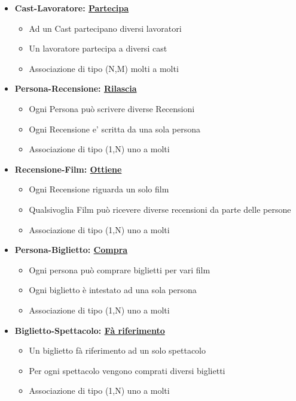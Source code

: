 \documentclass[10pt]{article}
\begin{document}
\begin{itemize}
		\item {\textbf{Cast-Lavoratore: \underline{Partecipa}}
		    \begin{itemize}
			    \item Ad un Cast partecipano diversi lavoratori
			    \item Un lavoratore partecipa a diversi cast
			    \item Associazione di tipo (N,M) molti a molti
		    \end{itemize}}
		\pagebreak
		\item {\textbf{Persona-Recensione: \underline{Rilascia}}
		    \begin{itemize}
			    \item Ogni Persona può scrivere diverse Recensioni 
			    \item Ogni Recensione e' scritta da una sola persona 
			    \item Associazione di tipo (1,N) uno a molti
		    \end{itemize}}  
		    
		\item {\textbf{Recensione-Film: \underline{Ottiene}}
		    \begin{itemize}
			    \item  Ogni Recensione riguarda un solo film
			    \item  Qualsivoglia Film può ricevere diverse recensioni da parte delle persone 			    
			    \item Associazione di tipo (1,N) uno a molti
		    \end{itemize}}  
		    
		\item {\textbf{Persona-Biglietto: \underline{Compra}}
		    \begin{itemize}
			    \item  Ogni persona può comprare biglietti per vari film
			    \item  Ogni biglietto è intestato ad una sola persona
			    \item Associazione di tipo (1,N) uno a molti
		    \end{itemize}}  
		
		\item {\textbf{Biglietto-Spettacolo: \underline{Fà riferimento}}
		    \begin{itemize}
			    \item  Un biglietto fà riferimento ad un solo spettacolo
			    \item  Per ogni spettacolo vengono comprati diversi biglietti
			    \item Associazione di tipo (1,N) uno a molti
		    \end{itemize}}		 
    \end{itemize}
\end{document}
